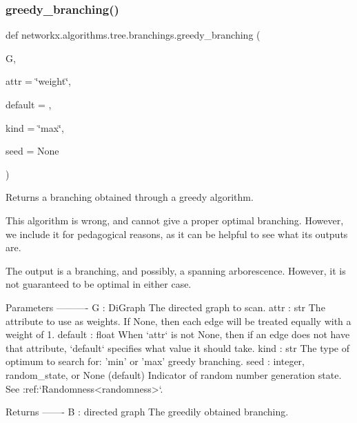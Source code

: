 \subsubsection{\texorpdfstring{greedy\+\_\+branching()}{greedy\_branching()}}
{\footnotesize\ttfamily def networkx.\+algorithms.\+tree.\+branchings.\+greedy\+\_\+branching (\begin{DoxyParamCaption}\item[{}]{G,  }\item[{}]{attr = {\ttfamily \char`\"{}weight\char`\"{}},  }\item[{}]{default = {},  }\item[{}]{kind = {\ttfamily \char`\"{}max\char`\"{}},  }\item[{}]{seed = {\ttfamily None} }\end{DoxyParamCaption})}

\begin{DoxyVerb}Returns a branching obtained through a greedy algorithm.

This algorithm is wrong, and cannot give a proper optimal branching.
However, we include it for pedagogical reasons, as it can be helpful to
see what its outputs are.

The output is a branching, and possibly, a spanning arborescence. However,
it is not guaranteed to be optimal in either case.

Parameters
----------
G : DiGraph
    The directed graph to scan.
attr : str
    The attribute to use as weights. If None, then each edge will be
    treated equally with a weight of 1.
default : float
    When `attr` is not None, then if an edge does not have that attribute,
    `default` specifies what value it should take.
kind : str
    The type of optimum to search for: 'min' or 'max' greedy branching.
seed : integer, random_state, or None (default)
    Indicator of random number generation state.
    See :ref:`Randomness<randomness>`.

Returns
-------
B : directed graph
    The greedily obtained branching.\end{DoxyVerb}
 \mbox{\label{namespacenetworkx_1_1algorithms_1_1tree_1_1branchings_a9b552352c9fefd824b96d8f5fd589472}} 

